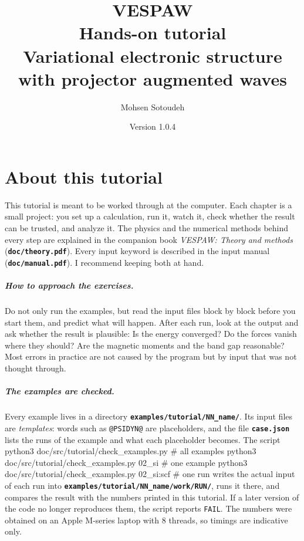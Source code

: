 \documentclass[11pt,a4paper,oneside]{book}
\title{\Huge\bfseries VESPAW\\[0.6em]\LARGE Hands-on tutorial\\[2em]
\normalsize Variational electronic structure with projector augmented waves}
\author{Mohsen Sotoudeh}
\date{Version 1.0.4}
\newcommand{\file}[1]{\textbf{\texttt{#1}}}
\newenvironment{shell}{\small\verbatim}{\endverbatim}
\begin{document}
\dominitoc
\frontmatter
\maketitle
\tableofcontents
\mainmatter

\chapter*{About this tutorial}

This tutorial is meant to be worked through at the computer. Each
chapter is a small project: you set up a calculation, run it, watch it,
check whether the result can be trusted, and analyze it. The physics and
the numerical methods behind every step are explained in the companion
book \emph{VESPAW: Theory and methods} (\file{doc/theory.pdf}). Every
input keyword is described in the input manual (\file{doc/manual.pdf}).
I recommend keeping both at hand.

\paragraph{How to approach the exercises.} Do not only run the
examples, but read the input files block by block before you start
them, and predict what will happen. After each run, look at the output
and ask whether the result is plausible: Is the energy converged? Do the
forces vanish where they should? Are the magnetic moments and the band
gap reasonable? Most errors in practice are not caused by the program
but by input that was not thought through.

\paragraph{The examples are checked.} Every example lives in a
directory \file{examples/tutorial/NN\_name/}. Its input files are
\emph{templates}: words such as \texttt{@PSIDYN@} are placeholders,
and the file \file{case.json} lists the runs of the example and what
each placeholder becomes. The script
\begin{shell}
python3 doc/src/tutorial/check_examples.py             # all examples
python3 doc/src/tutorial/check_examples.py 02_si       # one example
python3 doc/src/tutorial/check_examples.py 02_si:scf   # one run
\end{shell}
writes the actual input of each run into
\file{examples/tutorial/NN\_name/work/RUN/}, runs it there, and compares
the result with the numbers printed in this tutorial. If a later version
of the code no longer reproduces them, the script reports
\texttt{FAIL}. The numbers were obtained on an Apple M-series laptop
with 8 threads, so timings are indicative only.
\end{document}
